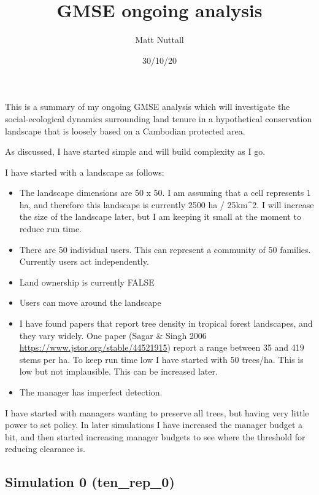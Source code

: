 \documentclass[
]{article}
\title{GMSE ongoing analysis}
\author{Matt Nuttall}
\date{30/10/20}
\providecommand{\tightlist}{%
  \setlength{\itemsep}{0pt}\setlength{\parskip}{0pt}}
\begin{document}
\maketitle

{
\setcounter{tocdepth}{2}
\tableofcontents
}
This is a summary of my ongoing GMSE analysis which will investigate the
social-ecological dynamics surrounding land tenure in a hypothetical
conservation landscape that is loosely based on a Cambodian protected
area.

As discussed, I have started simple and will build complexity as I go.

I have started with a landscape as follows:

\begin{itemize}
\tightlist
\item
  The landscape dimensions are 50 x 50. I am assuming that a cell
  represents 1 ha, and therefore this landscape is currently 2500 ha /
  25km\^{}2. I will increase the size of the landscape later, but I am
  keeping it small at the moment to reduce run time.
\item
  There are 50 individual users. This can represent a community of 50
  families. Currently users act independently.
\item
  Land ownership is currently FALSE
\item
  Users can move around the landscape
\item
  I have found papers that report tree density in tropical forest
  landscapes, and they vary widely. One paper (Sagar \& Singh 2006
  \url{https://www.jstor.org/stable/44521915}) report a range between 35
  and 419 stems per ha. To keep run time low I have started with 50
  trees/ha. This is low but not implausible. This can be increased
  later.
\item
  The manager has imperfect detection.
\end{itemize}

I have started with managers wanting to preserve all trees, but having
very little power to set policy. In later simulations I have increased
the manager budget a bit, and then started increasing manager budgets to
see where the threshold for reducing clearance is.

\hypertarget{simulation-0-ten_rep_0}{%
\subsection{Simulation 0 (ten\_rep\_0)}\label{simulation-0-ten_rep_0}}
\end{document}
